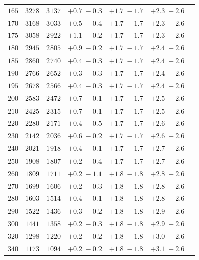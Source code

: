 \begin{table}
\begin{tabular}{ccccccc}
 $ 165$ & $  3278 $ & $  3137 $ & $ +0.7 \; -\!0.3$ & $ +1.7 \; -\!1.7$ & $ +2.3 \; -\!2.6$ \\
 $ 170$ & $  3168 $ & $  3033 $ & $ +0.5 \; -\!0.4$ & $ +1.7 \; -\!1.7$ & $ +2.3 \; -\!2.6$ \\
 $ 175$ & $  3058 $ & $  2922 $ & $ +1.1 \; -\!0.2$ & $ +1.7 \; -\!1.7$ & $ +2.3 \; -\!2.6$ \\
 $ 180$ & $  2945 $ & $  2805 $ & $ +0.9 \; -\!0.2$ & $ +1.7 \; -\!1.7$ & $ +2.4 \; -\!2.6$ \\
 $ 185$ & $  2860 $ & $  2740 $ & $ +0.4 \; -\!0.3$ & $ +1.7 \; -\!1.7$ & $ +2.4 \; -\!2.6$ \\
 $ 190$ & $  2766 $ & $  2652 $ & $ +0.3 \; -\!0.3$ & $ +1.7 \; -\!1.7$ & $ +2.4 \; -\!2.6$ \\
 $ 195$ & $  2678 $ & $  2566 $ & $ +0.4 \; -\!0.3$ & $ +1.7 \; -\!1.7$ & $ +2.4 \; -\!2.6$ \\
 $ 200$ & $  2583 $ & $  2472 $ & $ +0.7 \; -\!0.1$ & $ +1.7 \; -\!1.7$ & $ +2.5 \; -\!2.6$ \\
 $ 210$ & $  2425 $ & $  2315 $ & $ +0.7 \; -\!0.1$ & $ +1.7 \; -\!1.7$ & $ +2.5 \; -\!2.6$ \\
 $ 220$ & $  2280 $ & $  2171 $ & $ +0.4 \; -\!0.5$ & $ +1.7 \; -\!1.7$ & $ +2.6 \; -\!2.6$ \\
 $ 230$ & $  2142 $ & $  2036 $ & $ +0.6 \; -\!0.2$ & $ +1.7 \; -\!1.7$ & $ +2.6 \; -\!2.6$ \\
 $ 240$ & $  2021 $ & $  1918 $ & $ +0.4 \; -\!0.1$ & $ +1.7 \; -\!1.7$ & $ +2.7 \; -\!2.6$ \\
 $ 250$ & $  1908 $ & $  1807 $ & $ +0.2 \; -\!0.4$ & $ +1.7 \; -\!1.7$ & $ +2.7 \; -\!2.6$ \\
 $ 260$ & $  1809 $ & $  1711 $ & $ +0.2 \; -\!1.1$ & $ +1.8 \; -\!1.8$ & $ +2.8 \; -\!2.6$ \\
 $ 270$ & $  1699 $ & $  1606 $ & $ +0.2 \; -\!0.3$ & $ +1.8 \; -\!1.8$ & $ +2.8 \; -\!2.6$ \\
 $ 280$ & $  1603 $ & $  1514 $ & $ +0.4 \; -\!0.1$ & $ +1.8 \; -\!1.8$ & $ +2.8 \; -\!2.6$ \\
 $ 290$ & $  1522 $ & $  1436 $ & $ +0.3 \; -\!0.2$ & $ +1.8 \; -\!1.8$ & $ +2.9 \; -\!2.6$ \\
 $ 300$ & $  1441 $ & $  1358 $ & $ +0.2 \; -\!0.3$ & $ +1.8 \; -\!1.8$ & $ +2.9 \; -\!2.6$ \\
 $ 320$ & $  1298 $ & $  1220 $ & $ +0.2 \; -\!0.2$ & $ +1.8 \; -\!1.8$ & $ +3.0 \; -\!2.6$ \\
 $ 340$ & $  1173 $ & $  1094 $ & $ +0.2 \; -\!0.2$ & $ +1.8 \; -\!1.8$ & $ +3.1 \; -\!2.6$ \\

\end{tabular}
\end{table}
